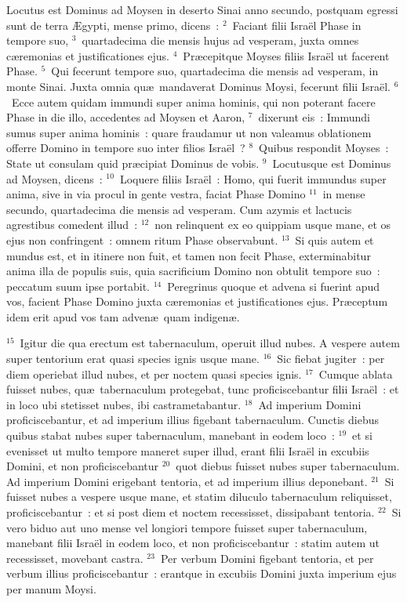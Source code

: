 \lettrine[lines=3,image=true,loversize=0.05,lraise=-0.03]{L}{}ocutus est Dominus ad Moysen in deserto Sinai anno secundo, postquam egressi sunt de terra \AE gypti, mense primo, dicens~:
${}^{2}$~Faciant filii Isra\"el Phase in tempore suo,
${}^{3}$~quartadecima die mensis hujus ad vesperam, juxta omnes c\ae remonias et justificationes ejus.
${}^{4}$~Pr\ae cepitque Moyses filiis Isra\"el ut facerent Phase.
${}^{5}$~Qui fecerunt tempore suo, quartadecima die mensis ad vesperam, in monte Sinai. Juxta omnia qu\ae\ mandaverat Dominus Moysi, fecerunt filii Isra\"el.
${}^{6}$~Ecce autem quidam immundi super anima hominis, qui non poterant facere Phase in die illo, accedentes ad Moysen et Aaron,
${}^{7}$~dixerunt eis~: Immundi sumus super anima hominis~: quare fraudamur ut non valeamus oblationem offerre Domino in tempore suo inter filios Isra\"el~?
${}^{8}$~Quibus respondit Moyses~: State ut consulam quid pr\ae cipiat Dominus de vobis.
${}^{9}$~Locutusque est Dominus ad Moysen, dicens~:
${}^{10}$~Loquere filiis Isra\"el~: Homo, qui fuerit immundus super anima, sive in via procul in gente vestra, faciat Phase Domino
${}^{11}$~in mense secundo, quartadecima die mensis ad vesperam. Cum azymis et lactucis agrestibus comedent illud~:
${}^{12}$~non relinquent ex eo quippiam usque mane, et os ejus non confringent~: omnem ritum Phase observabunt.
${}^{13}$~Si quis autem et mundus est, et in itinere non fuit, et tamen non fecit Phase, exterminabitur anima illa de populis suis, quia sacrificium Domino non obtulit tempore suo~: peccatum suum ipse portabit.
${}^{14}$~Peregrinus quoque et advena si fuerint apud vos, facient Phase Domino juxta c\ae remonias et justificationes ejus. Pr\ae ceptum idem erit apud vos tam adven\ae\ quam indigen\ae .


${}^{15}$~Igitur die qua erectum est tabernaculum, operuit illud nubes. A vespere autem super tentorium erat quasi species ignis usque mane.
${}^{16}$~Sic fiebat jugiter~: per diem operiebat illud nubes, et per noctem quasi species ignis.
${}^{17}$~Cumque ablata fuisset nubes, qu\ae\ tabernaculum protegebat, tunc proficiscebantur filii Isra\"el~: et in loco ubi stetisset nubes, ibi castrametabantur.
${}^{18}$~Ad imperium Domini proficiscebantur, et ad imperium illius figebant tabernaculum. Cunctis diebus quibus stabat nubes super tabernaculum, manebant in eodem loco~:
${}^{19}$~et si evenisset ut multo tempore maneret super illud, erant filii Isra\"el in excubiis Domini, et non proficiscebantur
${}^{20}$~quot diebus fuisset nubes super tabernaculum. Ad imperium Domini erigebant tentoria, et ad imperium illius deponebant.
${}^{21}$~Si fuisset nubes a vespere usque mane, et statim diluculo tabernaculum reliquisset, proficiscebantur~: et si post diem et noctem recessisset, dissipabant tentoria.
${}^{22}$~Si vero biduo aut uno mense vel longiori tempore fuisset super tabernaculum, manebant filii Isra\"el in eodem loco, et non proficiscebantur~: statim autem ut recessisset, movebant castra.
${}^{23}$~Per verbum Domini figebant tentoria, et per verbum illius proficiscebantur~: erantque in excubiis Domini juxta imperium ejus per manum Moysi.

